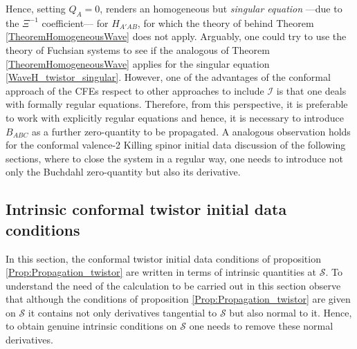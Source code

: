 \documentclass[10pt,a4paper]{article}
\theoremstyle{plain}
\begin{document}
{%
Hence, setting $Q_{A}=0$, renders an homogeneous but
\emph{singular equation} ---due to the $\Xi^{-1}$ coefficient---
for $H_{A'AB}$, for which the theory of behind Theorem
\ref{TheoremHomogeneousWave} does not apply. Arguably, one could try
to use the theory of Fuchsian systems to see if the analogous of
Theorem \ref{TheoremHomogeneousWave} applies for the singular equation
\eqref{WaveH_twistor_singular}.  However, one of the advantages of the
conformal approach of the CFEs respect to other approaches to include
$\mathscr{I}$ is that one deals with formally regular equations.
Therefore, from this perspective,
it is preferable to work with explicitly regular equations and hence,
it is necessary to introduce $B_{ABC}$ as a further zero-quantity to
be propagated.  A analogous observation holds for the conformal valence-2
Killing spinor initial data discussion of the following sections,
where to close the system in a regular way, one needs to introduce not
only the Buchdahl zero-quantity but also its derivative.





\subsection{Intrinsic conformal twistor initial data conditions}

In this section,  the conformal twistor initial data conditions
of proposition \ref{Prop:Propagation_twistor} are written in terms
of intrinsic quantities at $\mathcal{S}$.
To understand the need of the calculation to be carried out in this section
observe that although the conditions of proposition \ref{Prop:Propagation_twistor} are given
on $\mathcal{S}$ it contains not only derivatives tangential to $\mathcal{S}$ but
also normal to it. Hence, to obtain genuine intrinsic conditions on $\mathcal{S}$
one needs to remove these normal derivatives.

}
\end{document}

